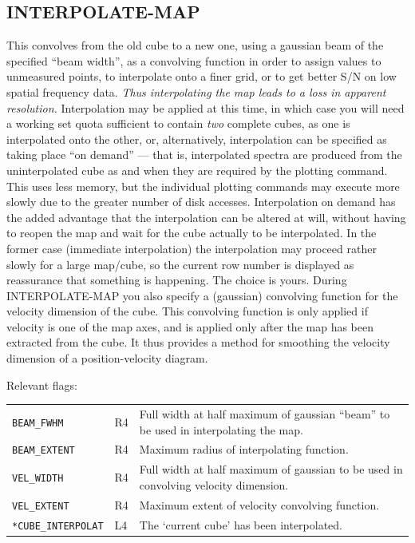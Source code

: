\documentclass[11pt,twoside]{report}
\begin{document}
\subsection{INTERPOLATE-MAP} 

This convolves from the old cube to a new one, using a gaussian beam of the
specified ``beam width'',  as a convolving function in order
to assign values to unmeasured points, to interpolate onto a finer grid, or to
get better S/N on low spatial frequency data.  {\em
Thus interpolating the map leads to a loss in apparent resolution.}
Interpolation may be applied at this time, in which case you will need a
working set quota sufficient to contain {\em two} complete cubes, as one is
interpolated onto the other, or, alternatively, interpolation can be specified
as taking place ``on demand'' --- that is, interpolated spectra are produced
from the uninterpolated cube as and when they are required by the plotting
command. This uses less memory, but the individual plotting commands may
execute more slowly due to the greater number of disk accesses. Interpolation
on demand has the added advantage that the interpolation can be altered at
will, without having to reopen the map and wait for the cube actually to be
interpolated. In the former case (immediate interpolation) the interpolation
may proceed rather slowly for a large map/cube, so the current row number is
displayed as reassurance that something is happening. The choice is yours.
During INTERPOLATE-MAP you also specify a (gaussian) convolving function for
the velocity dimension of the cube. This convolving function is only applied if
velocity is one of the map axes, and is applied only after the map has been
extracted from the cube. It thus provides a method for smoothing the velocity
dimension of a position-velocity diagram.

Relevant flags:\\
\begin{tabular}{lll}
  \verb+BEAM_FWHM+   & R4 & \parbox[t]{4in}
                            {Full width at half maximum of gaussian ``beam''
                            to be used in interpolating the map.}\\
  \verb+BEAM_EXTENT+ & R4 & Maximum radius of interpolating function.\\
  \verb+VEL_WIDTH+   & R4 &  \parbox[t]{4in}
                            {Full width at half maximum of gaussian
                            to be used in convolving velocity dimension.}\\
  \verb+VEL_EXTENT+  & R4 & Maximum extent of velocity convolving function.\\
  \verb+*CUBE_INTERPOLAT+ & L4 & The `current cube' has been interpolated.\\
\end{tabular}
\end{document}
